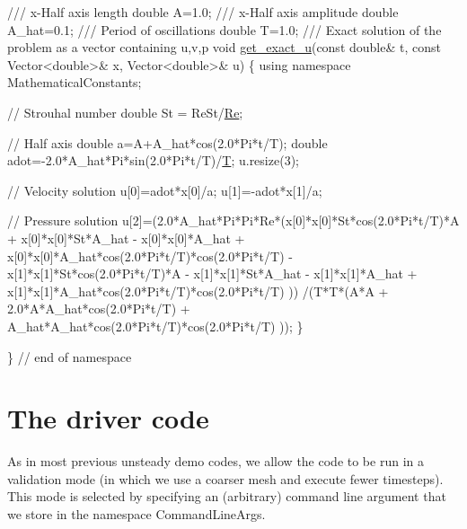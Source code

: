 \begin{DoxyCodeInclude}
\textcolor{comment}{}
\textcolor{comment}{ /// x-Half axis length}
\textcolor{comment}{} \textcolor{keywordtype}{double} A=1.0;
\textcolor{comment}{}
\textcolor{comment}{ /// x-Half axis amplitude}
\textcolor{comment}{} \textcolor{keywordtype}{double} A\_hat=0.1;
\textcolor{comment}{}
\textcolor{comment}{ /// Period of oscillations}
\textcolor{comment}{} \textcolor{keywordtype}{double} T=1.0;
\textcolor{comment}{}
\textcolor{comment}{ /// Exact solution of the problem as a vector containing u,v,p}
\textcolor{comment}{} \textcolor{keywordtype}{void} \hyperlink{namespaceGlobal__Physical__Variables_af29d0fbf7264555610176a1fc931591a}{get\_exact\_u}(\textcolor{keyword}{const} \textcolor{keywordtype}{double}& t, \textcolor{keyword}{const} Vector<double>& x, Vector<double>& u)
 \{
  \textcolor{keyword}{using namespace }MathematicalConstants;

  \textcolor{comment}{// Strouhal number}
  \textcolor{keywordtype}{double} St = ReSt/\hyperlink{namespaceGlobal__Physical__Variables_ab814e627d2eb5bc50318879d19ab16b9}{Re};

  \textcolor{comment}{// Half axis}
  \textcolor{keywordtype}{double} a=A+A\_hat*cos(2.0*Pi*t/T);
  \textcolor{keywordtype}{double} adot=-2.0*A\_hat*Pi*sin(2.0*Pi*t/T)/\hyperlink{namespaceGlobal__Physical__Variables_a1a806ee7c4d04d6afaba1d24d94dceea}{T}; 
  u.resize(3);

  \textcolor{comment}{// Velocity solution}
  u[0]=adot*x[0]/a;
  u[1]=-adot*x[1]/a;

  \textcolor{comment}{// Pressure solution}
  u[2]=(2.0*A\_hat*Pi*Pi*Re*(x[0]*x[0]*St*cos(2.0*Pi*t/T)*A + 
                            x[0]*x[0]*St*A\_hat - x[0]*x[0]*A\_hat +
                            x[0]*x[0]*A\_hat*cos(2.0*Pi*t/T)*cos(2.0*Pi*t/T) -
                            x[1]*x[1]*St*cos(2.0*Pi*t/T)*A - 
                            x[1]*x[1]*St*A\_hat - x[1]*x[1]*A\_hat +
                            x[1]*x[1]*A\_hat*cos(2.0*Pi*t/T)*cos(2.0*Pi*t/T) ))
   /(T*T*(A*A + 2.0*A*A\_hat*cos(2.0*Pi*t/T) + 
          A\_hat*A\_hat*cos(2.0*Pi*t/T)*cos(2.0*Pi*t/T) ));
 \}


\} \textcolor{comment}{// end of namespace}

\end{DoxyCodeInclude}




 

\hypertarget{index_main}{}\section{The driver code}\label{index_main}
As in most previous unsteady demo codes, we allow the code to be run in a validation mode (in which we use a coarser mesh and execute fewer timesteps). This mode is selected by specifying an (arbitrary) command line argument that we store in the namespace {\ttfamily Command\+Line\+Args}.


